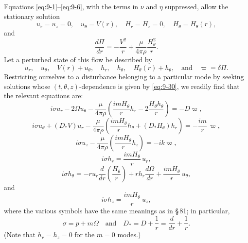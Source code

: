 Equations \eqref{eq:9-1}--\eqref{eq:9-6}, with the terms in $\nu$ and $\eta$ suppressed, allow the stationary solution
\begin{equation}
u_r = u_z = 0, \quad u_\theta = V(r), \quad H_r = H_z = 0, \quad H_\theta = H_\theta(r), \label{eq:9-103}
\end{equation}
and
\begin{equation}
\frac{d\Pi}{dr} = -\frac{V^2}{r} + \frac{\mu}{4\pi\rho}\frac{H_\theta^2}{r}. \label{eq:9-104}
\end{equation}
Let a perturbed state of this flow be described by
\begin{equation}
u_r, \quad u_\theta, \quad V(r) + u_\theta, \quad h_r, \quad h_\theta, \quad H_\theta(r) + h_\theta, \quad \text{and} \quad \varpi = \delta\Pi. \label{eq:9-105}
\end{equation}
Restricting ourselves to a disturbance belonging to a particular mode by seeking solutions whose $(t,\theta,z)$-dependence is given by \eqref{eq:9-30}, we readily find that the relevant equations are:
\begin{equation}
i\sigma u_r - 2\Omega u_\theta - \frac{\mu}{4\pi\rho}\left(\frac{imH_\theta}{r}h_r - 2\frac{H_\theta h_\theta}{r}\right) = -D\varpi, \label{eq:9-106}
\end{equation}
\begin{equation}
i\sigma u_\theta + (D_*V)u_r - \frac{\mu}{4\pi\rho}\left(\frac{imH_\theta}{r}h_\theta + (D_*H_\theta)h_r\right) = -\frac{im}{r}\,\varpi, \label{eq:9-107}
\end{equation}
\begin{equation}
i\sigma u_z - \frac{\mu}{4\pi\rho}\left(\frac{imH_\theta}{r}h_z\right) = -ik\varpi, \label{eq:9-108}
\end{equation}
\begin{equation}
i\sigma h_r = \frac{imH_\theta}{r}\, u_r, \label{eq:9-109}
\end{equation}
\begin{equation}
i\sigma h_\theta = -ru_r \frac{d}{dr}\!\left(\frac{H_\theta}{r}\right) + r h_r \frac{d\Omega}{dr} + \frac{imH_\theta}{r}\, u_\theta, \label{eq:9-110}
\end{equation}
and
\begin{equation}
i\sigma h_z = \frac{imH_\theta}{r}\, u_z, \label{eq:9-111}
\end{equation}
where the various symbols have the same meanings as in \S\,81; in particular,
\begin{equation}
\sigma = p + m\Omega \quad \text{and} \quad D_* = D + \frac{1}{r} = \frac{d}{dr} + \frac{1}{r}. \label{eq:9-112}
\end{equation}
(Note that $h_r = h_z = 0$ for the $m = 0$ modes.)

